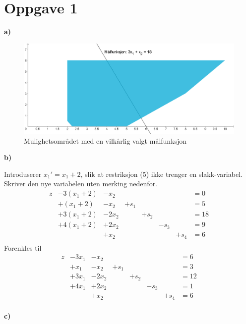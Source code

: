 \documentclass{article}
\begin{document}
    

    \captionsetup[figure]{labelformat=empty}

    
    \section*{\textbf{Oppgave 1}}
    \vspace*{12pt}\small\textbf{a)}
    \begin{figure}[ht]
        \centering
        \includegraphics*[width=\textwidth]{img/1a.PNG}
        \caption{Mulighetsområdet med en vilkårlig valgt målfunksjon}
    \end{figure}
    
    \vspace*{12pt}\small\textbf{b)}
    
    
    Introduserer $x_1' = x_1 + 2$, slik at restriksjon (5) ikke trenger en slakk-variabel. Skriver den nye variabelen uten merking nedenfor.
    \[
    \begin{array}{rrrrrrrl}
        z & -3(x_1 + 2) & -x_2 &&&&& = 0 \\ 
        & +(x_1 + 2) & -x_2 & +s_1 &&&& = 5 \\ 
        & +3(x_1 + 2) & -2x_2 &&+s_2&&& = 18 \\ 
        & +4(x_1 + 2) & +2x_2 &&&-s_3&& = 9 \\ 
        && +x_2 &&&&+s_4& = 6 \\ 
    \end{array}
    \]
    Forenkles til
    \[
    \begin{array}{rrrrrrrl}
        z & -3x_1 & -x_2 &&&&& = 6 \\ 
        & +x_1 & -x_2 & +s_1 &&&& = 3 \\ 
        & +3x_1 & -2x_2 &&+s_2&&& = 12 \\ 
        & +4x_1 & +2x_2 &&&-s_3&& = 1 \\ 
        && +x_2 &&&&+s_4& = 6 \\ 
    \end{array}
    \]
                
    \vspace*{12pt}\small\textbf{c)}
                
\end{document}
